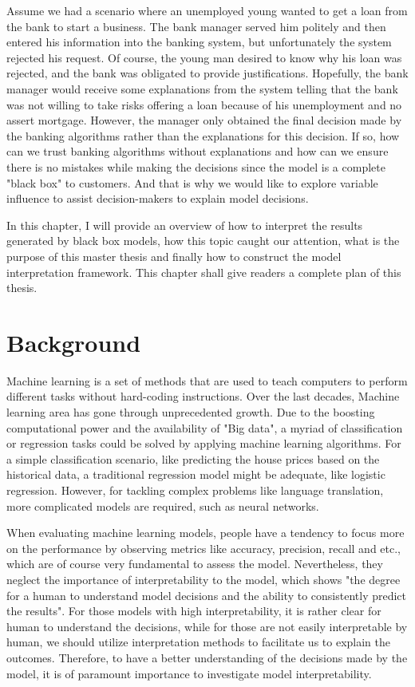 
Assume we had a scenario where an unemployed young wanted to get a loan from the bank to start a business. The bank manager served him politely and then entered his information into the banking system, but unfortunately the system rejected his request. Of course, the young man desired to know why his loan was rejected, and the bank was obligated to provide justifications. Hopefully, the bank manager would receive some explanations from the system telling that the bank was not willing to take risks offering a loan because of his unemployment and no assert mortgage. However, the manager only obtained the final decision made by the banking algorithms rather than the explanations for this decision. If so, how can we trust banking algorithms without explanations and how can we ensure there is no mistakes while making the decisions since the model is a complete "black box" to customers. And that is why we would like to explore variable influence to assist decision-makers to explain model decisions. 

In this chapter, I will provide an overview of how to interpret the results generated by black box models, how this topic caught our attention, what is the purpose of this master thesis and finally how to construct the model interpretation framework. This chapter shall give readers a complete plan of this thesis. 


\section{Background}

Machine learning is a set of methods that are used to teach computers to perform different tasks without hard-coding instructions. Over the last decades, Machine learning area has gone through unprecedented growth. Due to the boosting computational power and the availability of "Big data", a myriad of classification or regression tasks could be solved by applying machine learning algorithms. For a simple classification scenario, like predicting the house prices based on the historical data, a traditional regression model might be adequate, like logistic regression. However, for tackling complex problems like language translation, more complicated models are required, such as neural networks. 

When evaluating machine learning models, people have a tendency to focus more on the performance by observing metrics like accuracy, precision, recall and etc., which are of course very fundamental to assess the model. Nevertheless, they neglect the importance of interpretability to the model, which shows "the degree for a human to understand model decisions and the ability to consistently predict the results"\cite{kim2016examples}. For those models with high interpretability, it is rather clear for human to understand the decisions, while for those are not easily interpretable by human, we should utilize interpretation methods to facilitate us to explain the outcomes. Therefore, to have a better understanding of the decisions made by the model, it is of paramount importance to investigate model interpretability.


